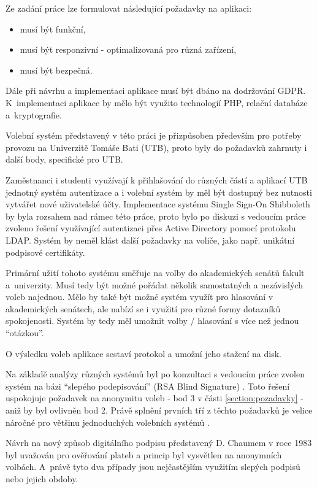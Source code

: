 Ze zadání práce lze formulovat následující požadavky na aplikaci:

\begin{itemize}
	\item musí být funkční,
	\item musí být responzivní - optimalizovaná pro různá zařízení,
	\item musí být bezpečná.
\end{itemize}

Dále při návrhu a implementaci aplikace musí být dbáno na dodržování GDPR. K~implementaci aplikace by mělo být využito technologií PHP, relační databáze a~kryptografie.

Volební systém představený v této práci je přizpůsoben především pro potřeby provozu na Univerzitě Tomáše Bati (UTB), proto byly do požadavků zahrnuty i další body, specifické pro UTB. 

Zaměstnanci i studenti využívají k přihlašování do různých částí a aplikací UTB jednotný systém autentizace a i volební systém by měl být dostupný bez nutnosti vytvářet nové uživatelské účty. Implementace systému Single Sign-On Shibboleth by byla rozsahem nad rámec této práce, proto bylo po diskuzi s vedoucím práce zvoleno řešení využívající autentizaci přes Active Directory pomocí protokolu LDAP. Systém by neměl klást další požadavky na voliče, jako např. unikátní podpisové certifikáty.

Primární užití tohoto systému směřuje na volby do akademických senátů fakult a~univerzity. Musí tedy být možné pořádat několik samostatných a nezávislých voleb najednou. Mělo by také být možné systém využít pro hlasování v akademických senátech, ale nabízí se i využití pro různé formy dotazníků spokojenosti. Systém by tedy měl umožnit volby / hlasování s více než jednou ``otázkou''.

O výsledku voleb aplikace sestaví protokol a umožní jeho stažení na disk.

Na základě analýzy různých systémů byl po konzultaci s vedoucím práce zvolen systém na bázi ``slepého podepisování'' (RSA Blind Signature) \cite{chaum}. Toto řešení uspokojuje požadavek na anonymitu voleb - bod 3 v části \ref{section:pozadavky} - aniž by byl ovlivněn bod 2. Právě splnění prvních tří z těchto požadavků je velice náročné pro většinu jednoduchých volebních systémů \cite{Schneier1996}.

Návrh na nový způsob digitálního podpisu představený D. Chaumem v roce 1983 byl uvažován pro ověřování plateb a princip byl vysvětlen na anonymních volbách. A~právě tyto dva případy jsou nejčastějším využitím slepých podpisů nebo jejich obdoby. 

